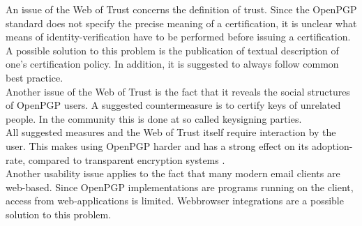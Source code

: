 An issue of the Web of Trust concerns the definition of trust. Since the OpenPGP standard \cite{RFC4880} does not specify the precise meaning of a certification, it is unclear what means of identity-verification have to be performed before issuing a certification. A possible solution to this problem is the publication of textual description of one's certification policy. In addition, it is suggested to always follow common best practice.   \\

Another issue of the Web of Trust is the fact that it reveals the social structures of OpenPGP users. A suggested countermeasure is to certify keys of unrelated people. In the  community this is done at so called keysigning parties.  \\

All suggested measures and the Web of Trust itself require interaction by the user. This makes using OpenPGP harder and has a strong effect on its adoption-rate, compared to transparent encryption systems \cite{Green2014}. \\

Another usability issue applies to the fact that many modern email clients are web-based. Since OpenPGP implementations are programs running on the client, access from web-applications is limited. Webbrowser integrations are a possible solution to this problem. 














